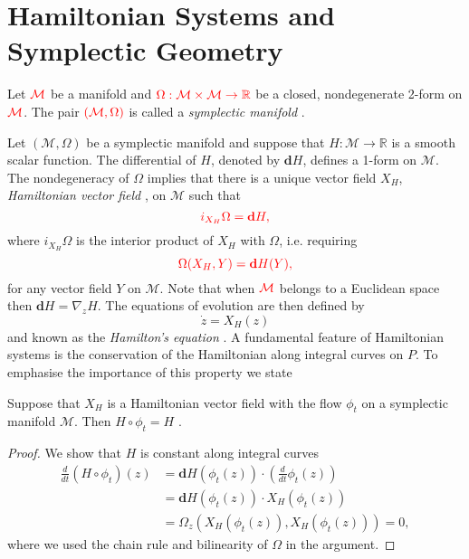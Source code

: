 \section{Hamiltonian Systems and Symplectic Geometry} \label{chap:Hasy:1}
Let $\color{red} \mathcal M$ be a manifold and $\color{red} \Omega:\mathcal M \times \mathcal M \to \mathbb R$ be a closed, nondegenerate 2-form on $\color{red} \mathcal M$. The pair $\color{red} (\mathcal M,\Omega)$ is called a \emph{symplectic manifold} {\edit \cite{Marsden:1999ck}}. 


{\edit Let $(\mathcal M,\Omega)$ be a symplectic manifold and suppose that $H:\mathcal M \to \mathbb R$ is a smooth scalar function. The differential of $H$, denoted by $\mathbf dH$, defines a 1-form on $\mathcal M$. The nondegeneracy of $\Omega$ implies that there is a unique vector field $X_H$, \emph{Hamiltonian vector field }\cite{da2003introduction,Marsden:1999ck}, on $\mathcal M$ such that}
\begin{equation} \label{eq:Hasy:1}
	\edit i_{X_H} \Omega = \mathbf dH, 
\end{equation}
{\edit where $i_{X_H} \Omega$ is the interior product of $X_H$ with $\Omega$, i.e. requiring}
\begin{equation}
	\color{red} \Omega(X_H,Y) = \mathbf dH(Y),
\end{equation}
{\edit for any vector field $Y$ on $\mathcal M$.} Note that when $\color{red} \mathcal M$ belongs to a Euclidean space then $\mathbf d H = \nabla_z H$. The equations of evolution are then defined by
\begin{equation} \label{eq:Hasy:2}
	\dot z = X_H(z)
\end{equation}
and known as the \emph{Hamilton's equation} \cite{Marsden:1999ck}. A fundamental feature of Hamiltonian systems is the conservation of the Hamiltonian along integral curves on $P$. To emphasise the importance of this property we state

\begin{theorem} \label{theorem:Hasy:1}
Suppose that $X_H$ is a Hamiltonian vector field with the flow $\phi_t$ on a symplectic manifold $\mathcal M$. Then $H\circ \phi_t = H$ {\edit \cite{Marsden:1999ck}}.
\end{theorem}

\begin{proof}
We show that $H$ is constant along integral curves
\begin{equation} \label{eq:Hasy:3}
\begin{aligned}
	\frac{d}{dt}(H\circ \phi_t)(z) &= \mathbf d H(\phi_t(z)) \cdot( \frac{d}{dt} \phi_t(z) ) \\
	&= \mathbf d H (\phi_t(z))\cdot X_H(\phi_t(z)) \\
	&= \Omega_z( X_H(\phi_t(z)), X_H(\phi_t(z)) ) = 0,
\end{aligned}
\end{equation}
where we used the chain rule and bilinearity of $\Omega$ in the argument.
\end{proof}

